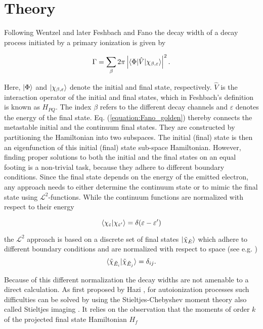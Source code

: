 \section{Theory}
\label{section:theory}

Following Wentzel \cite{Wentzel27} and later Feshbach \cite{Feshbach58,Feshbach62}
and Fano \cite{Fano61}
the decay width of a decay process initiated by a
primary ionization is given by 

\begin{equation} \label{equation:Fano_golden}
  \Gamma = \sum_\beta 2\pi
           \left| \braket{\Phi|\hat{V}|\chi_{\beta,\varepsilon}} \right|^2 .
\end{equation}

Here, $\ket{\Phi}$ and $\ket{\chi_{\beta,\varepsilon}}$ denote the initial and
final state, respectively. $\hat{V}$ is the interaction operator of the
initial and final states, which in Feshbach's definition is known as $H_{PQ}$.
The index $\beta$ refers to the different
decay channels and $\varepsilon$ denotes the energy of the final state.
Eq. (\ref{equation:Fano_golden}) thereby connects the metastable initial
and the continuum final states. They are constructed by partitioning the
Hamiltonian into two subspaces. The initial (final) state is then an
eigenfunction of this initial (final) state sub-space Hamiltonian.
However, finding proper solutions to both the initial and the final
states on an equal footing is a non-trivial task, because they adhere to
different boundary conditions. Since the final state depends on the energy
of the emitted electron, any approach needs to either determine the continuum
state or to mimic the final state using $\mathcal{L}^2$-functions.
While the continuum functions are normalized with respect to their energy

\begin{equation}
 \braket{\chi_\varepsilon| \chi_{\varepsilon'}} = \delta(\varepsilon-\varepsilon')
\end{equation}

the $\mathcal{L}^2$ approach is based on a discrete set of final states
$\ket{\tilde{\chi}_{\tilde{E}}}$
which adhere to different boundary
conditions and are normalized with respect to space (see e.g. \cite{Craigie14})
\begin{equation}
 \braket{ \tilde{\chi}_{\tilde{E}_i} | \tilde{\chi}_{\tilde{E}_j} } = \delta_{ij}.
\end{equation}

Because of this different normalization the decay widths are not amenable to
a direct calculation. As first proposed by Hazi \cite{hazi1978}, for
autoionization processes such difficulties
can be solved by using the
Stieltjes-Chebyshev moment theory also called Stieltjes imaging
\cite{Langhoff76,Corcoran77,MuellerPlathe90}.
It relies on the observation that the moments of order $k$ of the projected final
state Hamiltonian $H_f$

